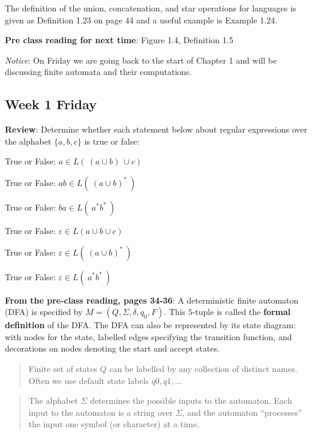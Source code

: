 \documentclass[12pt, oneside]{article}
\begin{document}
The definition of the union, concatenation, and star operations for languages is given 
as Definition 1.23 on page 44 and a useful example is Example 1.24.

{\bf Pre class reading for next time}: Figure 1.4, Definition 1.5

{\it Notice}: On Friday we are going back to the start of Chapter 1 and will be discussing finite 
automata and their computations.

\newpage
\subsection*{Week 1 Friday}



{\bf Review}: Determine whether each statement below about regular expressions
over the alphabet $\{a,b,c\}$ is true or false:
   
True or False: \qquad 
   $a  \in L(~(a \cup b )~\cup c)$

True or False: \qquad 
   $ab  \in L(~ (a \cup b)^*  ~)$
   
True or False: \qquad    
   $ba \in L( ~ a^* b^* ~)$
   
True or False: \qquad 
   $\varepsilon  \in L(a \cup b \cup c)$
   
True or False: \qquad 
   $\varepsilon  \in L(~ (a \cup b)^*  ~)$

True or False: \qquad 
   $\varepsilon \in L( ~ a^* b^* ~)$


{\bf From the pre-class reading, pages 34-36}:
A deterministic finite automaton (DFA) is specified by  $M = (Q, \Sigma, \delta, q_0, F)$.
This $5$-tuple is called the {\bf formal definition} of the DFA. The DFA can also 
be represented by its state diagram: with nodes for the state, labelled edges specifying the 
transition function, and decorations on nodes denoting the start and accept states.

\begin{quote}
Finite set of states $Q$ can be labelled by any collection of distinct names. Often
we use default state labels $q0, q1, \ldots$ 
\end{quote}

\begin{quote}  
The alphabet $\Sigma$ determines the possible inputs to the automaton. 
Each input to the automaton is a string over  $\Sigma$, and the automaton ``processes'' the input
one symbol (or character) at a time.
\end{quote}
\end{document}
